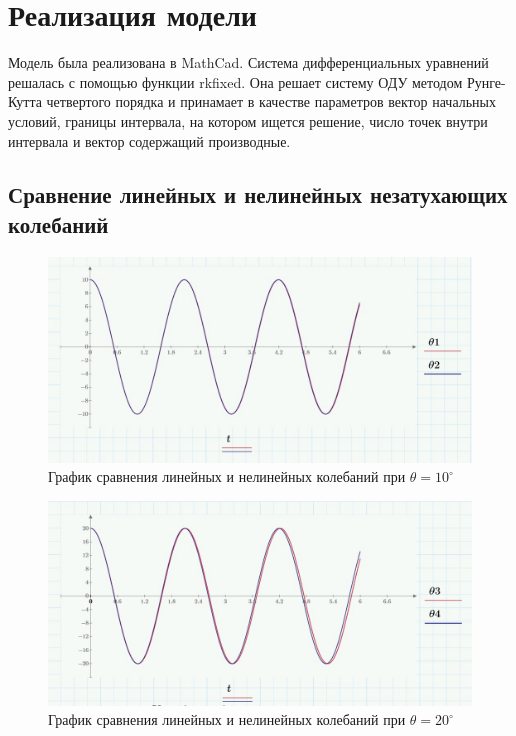 \documentclass[a4paper, 14pt]{extarticle}
\begin{document}
	\pagebreak
	\section{Реализация модели}
		Модель была реализована в MathCad. Система дифференциальных уравнений решалась с помощью функции rkfixed.
		Она решает систему ОДУ методом Рунге-Кутта четвертого порядка и принамает в качестве параметров вектор начальных условий, границы интервала, на котором ищется решение, число точек внутри интервала и вектор содержащий производные.
		\subsection{Сравнение линейных и нелинейных незатухающих колебаний}		
		\begin{figure}[H]
			\centering
			\includegraphics[width = \linewidth]{2.jpg}
			\caption[.] {График сравнения линейных и нелинейных колебаний при $\theta = 10^{\circ}$}
		\end{figure}
		\begin{figure}[H]
			\centering
			\includegraphics[width = \linewidth]{4.jpg}
			\caption[.] {График сравнения линейных и нелинейных колебаний при $\theta = 20^{\circ}$}
		\end{figure}
\end{document}
